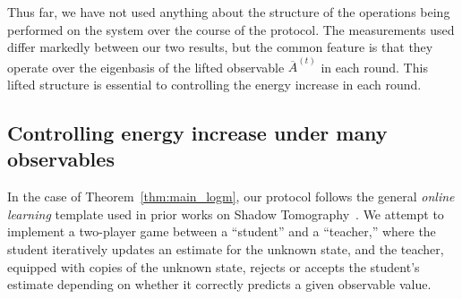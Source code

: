 \documentclass[10pt]{article}
\begin{document}
Thus far, we have not used anything about the structure of the operations being performed on the system over the course of the protocol. The measurements used differ markedly between our two results, but the common feature is that they operate over the eigenbasis of the lifted observable $\overline{A}^{(t)}$ in each round. This lifted structure is essential to controlling the energy increase in each round.

\subsection{Controlling energy increase under many observables}

In the case of Theorem~\ref{thm:main_logm}, our protocol follows the general \emph{online learning} template used in prior works on Shadow Tomography~\cite{Aar20,aaronson2019gentle,BO24,BB24}. We attempt to implement a two-player game between a ``student'' and a ``teacher,'' where the student iteratively updates an estimate for the unknown state, and the teacher, equipped with copies of the unknown state, rejects or accepts the student's estimate depending on whether it correctly predicts a given observable value.
\end{document}
